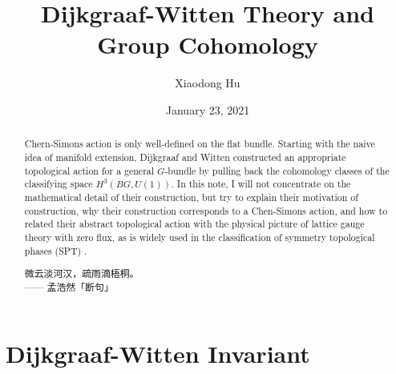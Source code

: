 \documentclass[10pt,nofootinbib,letterpaper]{revtex4}
\newcommand*{\kaishu}{\CJKfamily{kaishu}}
\begin{document}
\title{Dijkgraaf-Witten Theory and Group Cohomology}
\author{Xiaodong Hu}

\date{January 23, 2021}

\begin{abstract}
	Chern-Simons action is only well-defined on the flat bundle. Starting with the naive idea of manifold extension, Dijkgraaf and Witten \cite{dijkgraaf1990topological} constructed an appropriate topological action for a general $G$-bundle by pulling back the cohomology classes of the classifying space $H^3(BG,U(1))$. In this note, I will not concentrate on the mathematical detail of their construction, but try to explain their motivation of construction, why their construction corresponds to a Chen-Simons action, and how to related their abstract topological action with the physical picture of lattice gauge theory with zero flux, as is widely used in the classification of symmetry topological phases (SPT) \cite{chen2013symmetry}.\par
		\hfill\par
		{\centering\kaishu 微云淡河汉，疏雨滴梧桐。\\[0.5em]}
	\hfill------ 孟浩然「断句」
\end{abstract}

\maketitle
\tableofcontents

\section{Dijkgraaf-Witten Invariant}
\end{document}
